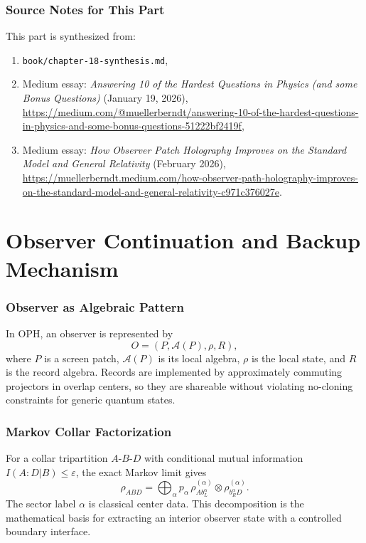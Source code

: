 \documentclass[11pt]{article}
\begin{document}
\section{Source Notes for This Part}
This part is synthesized from:
\begin{enumerate}
\item \texttt{book/chapter-18-synthesis.md},
\item Medium essay: \emph{Answering 10 of the Hardest Questions in Physics (and some Bonus Questions)} (January 19, 2026),\\
\url{https://medium.com/@muellerberndt/answering-10-of-the-hardest-questions-in-physics-and-some-bonus-questions-51222bf2419f},
\item Medium essay: \emph{How Observer Patch Holography Improves on the Standard Model and General Relativity} (February 2026),\\
\url{https://muellerberndt.medium.com/how-observer-path-holography-improves-on-the-standard-model-and-general-relativity-c971c376027e}.
\end{enumerate}

\clearpage
\part{Observer Continuation and Backup Mechanism}

\section{Observer as Algebraic Pattern}
In OPH, an observer is represented by
\[
O=(P,\mathcal{A}(P),\rho,R),
\]
where $P$ is a screen patch, $\mathcal{A}(P)$ is its local algebra, $\rho$ is the local state, and $R$ is the record algebra. Records are implemented by approximately commuting projectors in overlap centers, so they are shareable without violating no-cloning constraints for generic quantum states.

\section{Markov Collar Factorization}
For a collar tripartition $A$-$B$-$D$ with conditional mutual information $I(A:D|B)\le\varepsilon$, the exact Markov limit gives
\[
\rho_{ABD}
=\bigoplus_{\alpha} p_{\alpha}\,
\rho^{(\alpha)}_{A b_L^{\alpha}}
\otimes
\rho^{(\alpha)}_{b_R^{\alpha} D}.
\]
The sector label $\alpha$ is classical center data. This decomposition is the mathematical basis for extracting an interior observer state with a controlled boundary interface.
\end{document}
